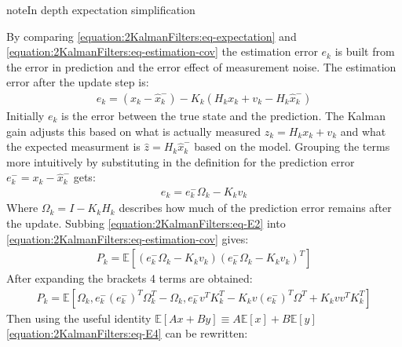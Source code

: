 \documentclass[letterpaper,10pt,english]{jupyterBook}
\begin{document}
\begin{sphinxadmonition}{note}{In depth expectation simplification}

\sphinxAtStartPar
By comparing \eqref{equation:2KalmanFilters:eq-expectation} and \eqref{equation:2KalmanFilters:eq-estimation-cov} the estimation error \(e_k\) is built from the error in prediction and the error effect of measurement noise. The estimation error after the update step is:
\begin{equation}\label{equation:2KalmanFilters:eq-E1}
\begin{split}e_k = (x_k - \hat{x}_k^-) - K_k \left( H_k {x}_k + v_k - H_k \hat{x}_k^- \right)\end{split}
\end{equation}
\sphinxAtStartPar
Initially \(e_k\) is the error between the true state and the prediction. The Kalman gain adjusts this based on what is actually measured \(z_k = H_k {x}_k + v_k\) and what the expected measurment is \(\hat{z} = H_k \hat{x}_k^-\) based on the model.
Grouping the terms more intuitively by substituting in the definition for the prediction error \(e^-_k = x_k - \hat{x}_k^-\) gets:
\begin{equation}\label{equation:2KalmanFilters:eq-E2}
\begin{split}e_k = e^-_k \Omega_k - K_kv_k\end{split}
\end{equation}
\sphinxAtStartPar
Where \(\Omega_k = I - K_k H_k\) describes how much of the prediction error remains after the update. Subbing \eqref{equation:2KalmanFilters:eq-E2} into \eqref{equation:2KalmanFilters:eq-estimation-cov} gives:
\begin{equation}\label{equation:2KalmanFilters:eq-E3}
\begin{split}P_k = \mathbb{E}[(e^-_k \Omega_k - K_kv_k)(e^-_k\Omega_k - K_kv_k)^T]\end{split}
\end{equation}
\sphinxAtStartPar
After expanding the brackets 4 terms are obtained:
\begin{equation}\label{equation:2KalmanFilters:eq-E4}
\begin{split}P_k = \mathbb{E}[ 
\Omega_k, e^-_k (e^-_k)^T \Omega_k^T 
- \Omega_k, e^-_k v^T K_k^T 
- K_k v (e^-_k)^T \Omega^T 
+ K_k v v^T K_k^T]\end{split}
\end{equation}
\sphinxAtStartPar
Then using the useful identity \(\mathbb{E}[Ax + By] \equiv A\mathbb{E}[x] + B \mathbb{E}[y]\) \eqref{equation:2KalmanFilters:eq-E4} can be rewritten:

\end{sphinxadmonition}
\end{document}
